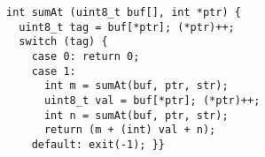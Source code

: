 \begin{lstlisting}
int sumAt (uint8_t buf[], int *ptr) {
  uint8_t tag = buf[*ptr]; (*ptr)++;
  switch (tag) {
    case 0: return 0;
    case 1:
      int m = sumAt(buf, ptr, str);
      uint8_t val = buf[*ptr]; (*ptr)++;
      int n = sumAt(buf, ptr, str);
      return (m + (int) val + n);
    default: exit(-1); }}
\end{lstlisting}
